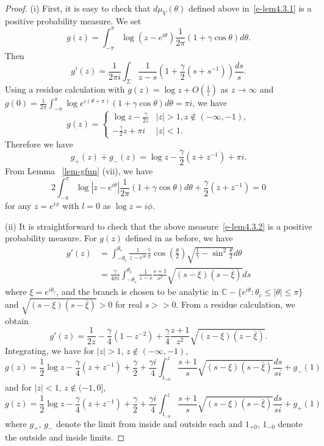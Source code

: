 \documentclass{amsart}
\theoremstyle{definition}
\theoremstyle{remark}
\numberwithin{equation}{section}
\newcommand{\C}{\mathbb C}
\begin{document}
\begin{proof}
  (i) First, it is easy to check that $d\mu_V(\theta)$ defined above 
in~\eqref{e-lem4.3.1} is a positive probability measure. We set 
    $$g(z)=\int_{-\pi}^{\pi}\log (z-e^{i\theta})\frac{1}{2\pi}(1+\gamma \cos{\theta}) d\theta.$$
  Then $$g'(z)=\frac1{2\pi i} \int_{\Sigma} \frac1{z-s}(1+\frac{\gamma}2(s+s^{-1}))\frac{ds}{s}.$$
  Using a residue calculation with $g(z)=\log{z}+O(\frac1{z})$ as 
$z\to\infty$ and $g(0)=\frac1{2\pi} \int_{-\pi}^{\pi} 
\log{e^{i(\theta+\pi)}}(1+\gamma\cos{\theta})d\theta=\pi i$, we have
  \begin{equation}\label{e-g1} g(z)=
    \begin{cases}
      \log{z}-\frac{\gamma}{2z}& |z|>1, z\notin (-\infty,-1),\\
      -\frac{\gamma}2 z+\pi i& |z|<1.
    \end{cases}
  \end{equation}
  Therefore we have $$g_+(z)+g_-(z)=\log{z}-\frac{\gamma}2(z+z^{-1})+\pi i.$$
  From Lemma ~\ref{lem-gfun} (vii), we have
  $$2\int_{-\pi}^{\pi}\log |z-e^{i\theta}| \frac1{2\pi} 
(1+\gamma\cos{\theta}) d\theta +\frac{\gamma}2(z+z^{-1}) = 0$$
  for any $z=e^{i\phi}$ with $l=0$ as $\log{z}=i\phi$.

  (ii) It is straightforward to check that the above 
measure~\eqref{e-lem4.3.2} is 
a positive probability measure.
For $g(z)$ defined in as before, we have
  \begin{equation*}
    \begin{split}
      g'(z)&= \int_{-\theta_c}^{\theta_c} \frac1{z-e^{i\theta}} 
\frac{\gamma}{\pi} \cos(\frac{\theta}{2}) 
\sqrt{\frac1{\gamma}-\sin^2\frac{\theta}{2}} d\theta \\
      &= \frac{\gamma}{4\pi i} \int_{-\theta_c}^{\theta_c} 
\frac1{z-s}
\frac{s+1}{s^2} \sqrt{(s-\xi)(s-\bar{\xi})} ds
    \end{split}
  \end{equation*}
  where $\xi=e^{i\theta_c}$, and the branch is chosen to be analytic in 
$\C-\{ e^{i\theta} : \theta_c\le |\theta| \le \pi \}$ 
and $\sqrt{(s-\xi)(s-\bar{\xi})}>0$ for real $s>>0$. 
From a residue calculation, we obtain
  $$g'(z)= \frac1{2z}-\frac{\gamma}4(1-z^{-2}) +\frac{\gamma}4\frac{z+1}{z^2}\sqrt{(z-\xi)(z-\bar{\xi})}.$$
  Integrating, we have for $|z|>1$, $z\notin (-\infty,-1)$, 
  \begin{equation*}
    g(z)=\frac12\log{z} -\frac{\gamma}{4} (z+z^{-1}) +\frac{\gamma}2
    +\frac{\gamma i}4 \int_{1_{+0}}^{z} \frac{s+1}{s}\sqrt{(s-\xi)(s-\bar{\xi})}
    \frac{ds}{si} +g_-(1)
  \end{equation*}
and for $|z|<1$, $z\notin (-1,0]$,
  \begin{equation*}
    g(z)=\frac12\log{z} -\frac{\gamma}{4} (z+z^{-1}) +\frac{\gamma}2
    +\frac{\gamma i}4 \int_{1_{-0}}^{z} \frac{s+1}{s}\sqrt{(s-\xi)(s-\bar{\xi})}
    \frac{ds}{si} +g_+(1)
  \end{equation*}
 where $g_+$, $g_-$ denote the limit from inside and outside each and 
$1_{+0}$, $1_{-0}$ denote the outside and inside limits.


\end{proof}
\end{document}
